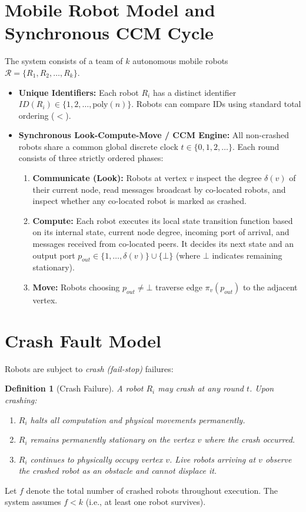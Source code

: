 \documentclass[11pt,a4paper]{report}
\newtheorem{definition}[theorem]{Definition}
\begin{document}
\section{Mobile Robot Model and Synchronous CCM Cycle}
The system consists of a team of $k$ autonomous mobile robots $\mathcal{R} = \{R_1, R_2, \dots, R_k\}$.
\begin{itemize}
    \item \textbf{Unique Identifiers:} Each robot $R_i$ has a distinct identifier $ID(R_i) \in \{1, 2, \dots, \text{poly}(n)\}$. Robots can compare IDs using standard total ordering ($<$).
    \item \textbf{Synchronous Look-Compute-Move / CCM Engine:} All non-crashed robots share a common global discrete clock $t \in \{0, 1, 2, \dots\}$. Each round consists of three strictly ordered phases:
    \begin{enumerate}
        \item \textbf{Communicate (Look):} Robots at vertex $v$ inspect the degree $\delta(v)$ of their current node, read messages broadcast by co-located robots, and inspect whether any co-located robot is marked as crashed.
        \item \textbf{Compute:} Each robot executes its local state transition function based on its internal state, current node degree, incoming port of arrival, and messages received from co-located peers. It decides its next state and an output port $p_{out} \in \{1, \dots, \delta(v)\} \cup \{\bot\}$ (where $\bot$ indicates remaining stationary).
        \item \textbf{Move:} Robots choosing $p_{out} \ne \bot$ traverse edge $\pi_v(p_{out})$ to the adjacent vertex.
    \end{enumerate}
\end{itemize}

\section{Crash Fault Model}
Robots are subject to \emph{crash (fail-stop)} failures:
\begin{definition}[Crash Failure]
    A robot $R_i$ may crash at any round $t$. Upon crashing:
    \begin{enumerate}
        \item $R_i$ halts all computation and physical movements permanently.
        \item $R_i$ remains permanently stationary on the vertex $v$ where the crash occurred.
        \item $R_i$ continues to physically occupy vertex $v$. Live robots arriving at $v$ observe the crashed robot as an obstacle and cannot displace it.
    \end{enumerate}
\end{definition}
Let $f$ denote the total number of crashed robots throughout execution. The system assumes $f < k$ (i.e., at least one robot survives).
\end{document}
